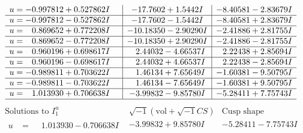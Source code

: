 \documentclass[1p]{elsarticle_modified}
\theoremstyle{definition}
\newcommand{\I}{\sqrt{-1}}
\begin{document}
$$\begin{array}{c|c|c}
\begin{aligned}
u &= -0.997812 + 0.527862 I\end{aligned}
 & -17.7602 + 1.5442 I & -8.40581 - 2.83679 I \\ \hline\begin{aligned}
u &= -0.997812 - 0.527862 I\end{aligned}
 & -17.7602 - 1.5442 I & -8.40581 + 2.83679 I \\ \hline\begin{aligned}
u &= \phantom{-}0.869652 + 0.772208 I\end{aligned}
 & -10.18350 - 2.90290 I & -2.41886 + 2.81755 I \\ \hline\begin{aligned}
u &= \phantom{-}0.869652 - 0.772208 I\end{aligned}
 & -10.18350 + 2.90290 I & -2.41886 - 2.81755 I \\ \hline\begin{aligned}
u &= \phantom{-}0.960196 + 0.698617 I\end{aligned}
 & \phantom{-}2.44032 - 4.66537 I & \phantom{-}2.22438 + 2.85694 I \\ \hline\begin{aligned}
u &= \phantom{-}0.960196 - 0.698617 I\end{aligned}
 & \phantom{-}2.44032 + 4.66537 I & \phantom{-}2.22438 - 2.85694 I \\ \hline\begin{aligned}
u &= -0.989811 + 0.703622 I\end{aligned}
 & \phantom{-}1.46134 + 7.65649 I & -1.60381 - 9.50795 I \\ \hline\begin{aligned}
u &= -0.989811 - 0.703622 I\end{aligned}
 & \phantom{-}1.46134 - 7.65649 I & -1.60381 + 9.50795 I \\ \hline\begin{aligned}
u &= \phantom{-}1.013930 + 0.706638 I\end{aligned}
 & -3.99832 - 9.85780 I & -5.28411 + 7.75743 I\\
 \hline 
 \end{array}$$\newpage$$\begin{array}{c|c|c}  
\text{Solutions to }I^u_{1}& \I (\text{vol} + \sqrt{-1}CS) & \text{Cusp shape}\\
 \hline 
\begin{aligned}
u &= \phantom{-}1.013930 - 0.706638 I\end{aligned}
 & -3.99832 + 9.85780 I & -5.28411 - 7.75743 I \\ \hline\begin{aligned}

\end{aligned}
\end{array}$$
\end{document}
